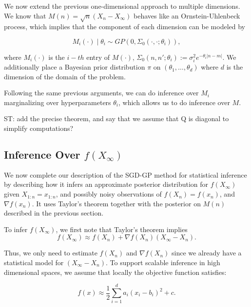 \documentclass[12pt,english]{article}
\newcommand{\stcomment}[1]{{\color{blue} ST: #1}}
\newcommand{\stedit}[1]{{\color{blue} #1}}
\begin{document}
\stedit{We now extend the previous one-dimensional approach to multiple dimensions. We know that $M(n)=\sqrt{n}\left(X_{n}-X_{\infty}\right)$ behaves like an Ornstein-Uhlenbeck process, which implies that the component of each dimension can be modeled by

\[
M_{i}(\cdot) \mid \theta_{i}\sim GP\left(0,\Sigma_{0}\left(\cdot,\cdot; \theta_{i}\right)\right),
\]

where $M_{i}(\cdot)$ is the $i-th$ entry of $M(\cdot)$, $\Sigma_{0}(n,n';\theta_{i}):=\sigma_{i}^{2}e^{-\theta_{i}\left|n-m\right|}$. We additionally place a Bayesian prior distribution $\pi$ on $(\theta_{1},\ldots,\theta_{d})$ where $d$ is the dimension of the domain of the problem.

Following the same previous arguments, we can do inference over $M_{i}$  marginalizing over hyperparameters $\theta_{i}$, which allows us to do inference over $M$.} \stcomment{add the precise theorem, and say that we assume that Q is diagonal to simplify computations?}

\subsection{Inference Over $f(X_\infty)$}
\label{sec:SGD-GP-2}
We now complete our description of the SGD-GP method for statistical inference by describing how 
it infers an approximate posterior distribution for $f\left(X_{\infty}\right)$ given $X_{1:n} = x_{1:n}$, \stedit{and possibly noisy observations of $f(X_n)=f(x_n)$, and $\nabla f\left(x_{n}\right)$}. It uses \stedit{Taylor's theorem} together with the posterior on $M(n)$ described in the previous section. 




To infer $f(X_\infty)$, we first note that 
Taylor's theorem implies
\begin{equation}
\label{eq:a}
f\left(X_{\infty}\right) \approx f\left(X_{n}\right)+\nabla f\left(X_{n}\right)\left(X_{\infty}-X_{n}\right).
\end{equation}

Thus, we only need to estimate $f\left(X_{n}\right)$ and $\nabla f\left(X_{n}\right)$ since we already have a statistical model for $\left(X_{\infty}-X_{n}\right)$. To support scalable inference in high dimensional spaces, we assume that locally the objective function satisfies:

\[
f\left(x\right)\approx \frac{1}{2}\sum_{i=1}^{d}a_{i}\left(x_{i}-b_{i}\right)^{2}+c.
\]
\end{document}
